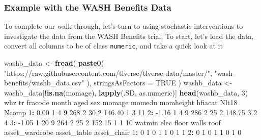 \documentclass[12pt, krantz2,]{krantz}
\newenvironment{Shaded}{\begin{snugshade}}{\end{snugshade}}
\newcommand{\DataTypeTok}[1]{\textcolor[rgb]{0.27,0.27,0.27}{#1}}
\newcommand{\DecValTok}[1]{\textcolor[rgb]{0.06,0.06,0.06}{#1}}
\newcommand{\FloatTok}[1]{\textcolor[rgb]{0.06,0.06,0.06}{#1}}
\newcommand{\KeywordTok}[1]{\textcolor[rgb]{0.27,0.27,0.27}{\textbf{#1}}}
\newcommand{\NormalTok}[1]{#1}
\newcommand{\OperatorTok}[1]{\textcolor[rgb]{0.43,0.43,0.43}{\textbf{#1}}}
\newcommand{\OtherTok}[1]{\textcolor[rgb]{0.37,0.37,0.37}{#1}}
\newcommand{\StringTok}[1]{\textcolor[rgb]{0.5,0.5,0.5}{#1}}
\theoremstyle{definition}
\theoremstyle{definition}
\theoremstyle{definition}
\newcommand{\1}{\mathbbm{1}}
\begin{document}
\hypertarget{example-with-the-wash-benefits-data}{%
\subsubsection{Example with the WASH Benefits Data}\label{example-with-the-wash-benefits-data}}

To complete our walk through, let's turn to using stochastic interventions to
investigate the data from the WASH Benefits trial. To start, let's load the
data, convert all columns to be of class \texttt{numeric}, and take a quick look at it

\begin{Shaded}
\begin{Highlighting}[]
\NormalTok{washb_data <-}\StringTok{ }\KeywordTok{fread}\NormalTok{(}
  \KeywordTok{paste0}\NormalTok{(}
    \StringTok{"https://raw.githubusercontent.com/tlverse/tlverse-data/master/"}\NormalTok{,}
    \StringTok{"wash-benefits/washb_data.csv"}
\NormalTok{  ),}
  \DataTypeTok{stringsAsFactors =} \OtherTok{TRUE}
\NormalTok{)}
\NormalTok{washb_data <-}\StringTok{ }\NormalTok{washb_data[}\OperatorTok{!}\KeywordTok{is.na}\NormalTok{(momage), }\KeywordTok{lapply}\NormalTok{(.SD, as.numeric)]}
\KeywordTok{head}\NormalTok{(washb_data, }\DecValTok{3}\NormalTok{)}
\NormalTok{     whz tr fracode month aged sex momage momedu momheight hfiacat Nlt18 Ncomp}
\DecValTok{1}\OperatorTok{:}\StringTok{  }\FloatTok{0.00}  \DecValTok{1}       \DecValTok{4}     \DecValTok{9}  \DecValTok{268}   \DecValTok{2}     \DecValTok{30}      \DecValTok{2}    \FloatTok{146.40}       \DecValTok{1}     \DecValTok{3}    \DecValTok{11}
\DecValTok{2}\OperatorTok{:}\StringTok{ }\FloatTok{-1.16}  \DecValTok{1}       \DecValTok{4}     \DecValTok{9}  \DecValTok{286}   \DecValTok{2}     \DecValTok{25}      \DecValTok{2}    \FloatTok{148.75}       \DecValTok{3}     \DecValTok{2}     \DecValTok{4}
\DecValTok{3}\OperatorTok{:}\StringTok{ }\FloatTok{-1.05}  \DecValTok{1}      \DecValTok{20}     \DecValTok{9}  \DecValTok{264}   \DecValTok{2}     \DecValTok{25}      \DecValTok{2}    \FloatTok{152.15}       \DecValTok{1}     \DecValTok{1}    \DecValTok{10}
\NormalTok{   watmin elec floor walls roof asset_wardrobe asset_table asset_chair}
\DecValTok{1}\OperatorTok{:}\StringTok{      }\DecValTok{0}    \DecValTok{1}     \DecValTok{0}     \DecValTok{1}    \DecValTok{1}              \DecValTok{0}           \DecValTok{1}           \DecValTok{1}
\DecValTok{2}\OperatorTok{:}\StringTok{      }\DecValTok{0}    \DecValTok{1}     \DecValTok{0}     \DecValTok{1}    \DecValTok{1}              \DecValTok{0}           \DecValTok{1}           \DecValTok{0}

\end{Highlighting}
\end{Shaded}
\end{document}
